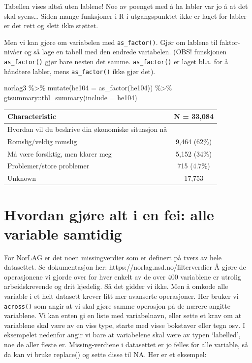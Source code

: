 \documentclass[
  letterpaper,
  DIV=11,
  numbers=noendperiod]{scrreprt}
\newenvironment{Shaded}{\begin{snugshade}}{\end{snugshade}}
\newcommand{\AttributeTok}[1]{\textcolor[rgb]{0.40,0.45,0.13}{#1}}
\newcommand{\FunctionTok}[1]{\textcolor[rgb]{0.28,0.35,0.67}{#1}}
\newcommand{\NormalTok}[1]{\textcolor[rgb]{0.00,0.23,0.31}{#1}}
\newcommand{\SpecialCharTok}[1]{\textcolor[rgb]{0.37,0.37,0.37}{#1}}
\begin{document}
Tabellen vises altså uten lablene! Noe av poenget med å ha labler var jo
å at det skal syens\ldots{} Siden mange funksjoner i R i utgangspunktet
ikke er laget for labler er det rett og slett ikke støttet.

Men vi kan gjøre om variabelen med \texttt{as\_factor()}. Gjør om
lablene til faktor-nivåer og så lage en tabell med den endrede
variabelen. (OBS! funskjonen \texttt{as\_factor()} gjør bare nesten det
samme. \texttt{as\_factor()} er laget bl.a. for å håndtere labler, mens
\texttt{as\_factor()} ikke gjør det).

\begin{Shaded}
\begin{Highlighting}[]
\NormalTok{norlag3 }\SpecialCharTok{\%\textgreater{}\%} 
  \FunctionTok{mutate}\NormalTok{(}\AttributeTok{he104 =} \FunctionTok{as\_factor}\NormalTok{(he104)) }\SpecialCharTok{\%\textgreater{}\%} 
\NormalTok{  gtsummary}\SpecialCharTok{::}\FunctionTok{tbl\_summary}\NormalTok{(}\AttributeTok{include =}\NormalTok{ he104)}
\end{Highlighting}
\end{Shaded}

\begin{longtable}[]{@{}lc@{}}
\toprule()
\textbf{Characteristic} & \textbf{N = 33,084} \\
\midrule()
\endhead
Hvordan vil du beskrive din økonomiske situasjon nå & \\
Romslig/veldig romslig & 9,464 (62\%) \\
Må være forsiktig, men klarer meg & 5,152 (34\%) \\
Problemer/store problemer & 715 (4.7\%) \\
Unknown & 17,753 \\
\bottomrule()
\end{longtable}

\hypertarget{hvordan-gjuxf8re-alt-i-en-fei-alle-variable-samtidig}{%
\section{Hvordan gjøre alt i en fei: alle variable
samtidig}\label{hvordan-gjuxf8re-alt-i-en-fei-alle-variable-samtidig}}

For NorLAG er det noen missingverdier som er definert på tvers av hele
datasettet. Se dokumentasjon her: https://norlag.nsd.no/filterverdier Å
gjøre de operasjonene vi gjorde over for hver enkelt av de over 400
variablene er utrolig arbeidskrevende og drit kjedelig. Så det gidder vi
ikke. Men å omkode alle variable i et helt datasett krever litt mer
avanserte operasjoner. Her bruker vi \texttt{across()} som angir at vi
skal gjøre samme operasjon på de nærere angitte variablene. Vi kan enten
gi en liste med variabelnavn, eller sette et krav om at variablene skal
være av en viss type, starte med visse bokstaver eller tegn osv. I
eksempelet nedenfor angir vi bare at variabelene skal være av typen
`labelled', noe de aller fleste er. Missing-verdiene i datasettet er jo
felles for alle variable, så da kan vi bruke replace() og sette disse
til NA. Her er et eksempel:
\end{document}
